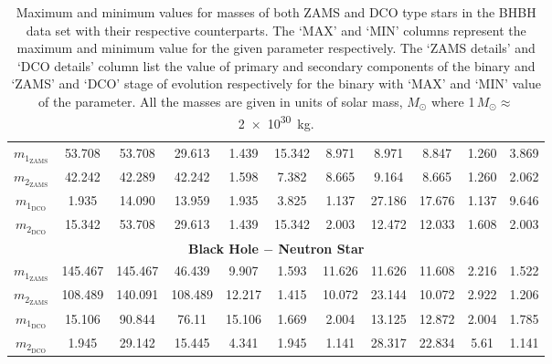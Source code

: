 \documentclass[journal, twocolumn]{IEEEtran}
\newcommand{\mone}[1]{m_{1_{\text{#1}}}}
\newcommand{\mtwo}[1]{m_{2_{\text{#1}}}}
\begin{document}
\begin{table}[!h]
{\begin{tabular}{@{}ccccccccccc@{}}
                $\mone{ZAMS}$ & 53.708  & 53.708  & 29.613    & 1.439   & 15.342    & 8.971  & 8.971   & 8.847     & 1.260   & 3.869     \\
                $\mtwo{ZAMS}$ & 42.242  & 42.289  & 42.242    & 1.598   & 7.382     & 8.665  & 9.164   & 8.665     & 1.260   & 2.062     \\
                $\mone{DCO}$  & 1.935   & 14.090  & 13.959    & 1.935   & 3.825     & 1.137  & 27.186  & 17.676    & 1.137   & 9.646     \\
                $\mtwo{DCO}$  & 15.342  & 53.708  & 29.613    & 1.439   & 15.342    & 2.003  & 12.472  & 12.033    & 1.608   & 2.003     \\

                \multicolumn{11}{c}{\textbf{Black Hole $-$ Neutron Star}} \\

                $\mone{ZAMS}$ & 145.467 & 145.467 & 46.439    & 9.907   & 1.593     & 11.626 & 11.626  & 11.608    & 2.216   & 1.522     \\
                $\mtwo{ZAMS}$ & 108.489 & 140.091 & 108.489   & 12.217  & 1.415     & 10.072 & 23.144  & 10.072    & 2.922   & 1.206     \\
                $\mone{DCO}$  & 15.106  & 90.844  & 76.11     & 15.106  & 1.669     & 2.004  & 13.125  & 12.872    & 2.004   & 1.785     \\
                $\mtwo{DCO}$  & 1.945   & 29.142  & 15.445    & 4.341   & 1.945     & 1.141  & 28.317  & 22.834    & 5.61    & 1.141     \\ \bottomrule
            \end{tabular}%
        }
        \caption{Maximum and minimum values for masses of both ZAMS and DCO type stars in the BHBH data set with their respective counterparts. The `MAX' and `MIN' columns represent the maximum and minimum value for the given parameter respectively. The `ZAMS details' and `DCO details' column list the value of primary and secondary components of the binary and `ZAMS' and `DCO' stage of evolution respectively for the binary with `MAX' and `MIN' value of the parameter. All the masses are given in units of solar mass, $M_\odot$ where \num{1}\,$M_\odot \approx$ \SI{2e30}{\kilogram}.}
        \label{tab:bhbh-details-table}
    \end{table}
\end{document}
